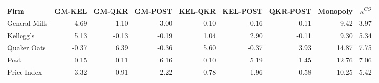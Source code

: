 \centering
\begin{tabular}{lrrrrrrrr}
\toprule
Firm &  GM-KEL &  GM-QKR &  GM-POST &  KEL-QKR &  KEL-POST &  QKR-POST &  Monopoly &  $\kappa^{CO}$ \\
\midrule
 General Mills &    4.69 &    1.10 &     3.00 &    -0.10 &     -0.16 &     -0.11 &      9.42 &              3.97 \\
       Kellogg's &    5.13 &   -0.13 &    -0.19 &     1.04 &      2.90 &     -0.11 &      9.30 &              5.34 \\
   Quaker Oats &   -0.37 &    6.39 &    -0.36 &     5.60 &     -0.37 &      3.93 &     14.87 &              7.75 \\
          Post &   -0.15 &   -0.11 &     6.16 &    -0.10 &      5.19 &      1.45 &     12.76 &              7.06 \\
\midrule
   Price Index &    3.32 &    0.91 &     2.22 &     0.78 &      1.96 &      0.58 &     10.25 &              5.42 \\
\bottomrule
\end{tabular}
